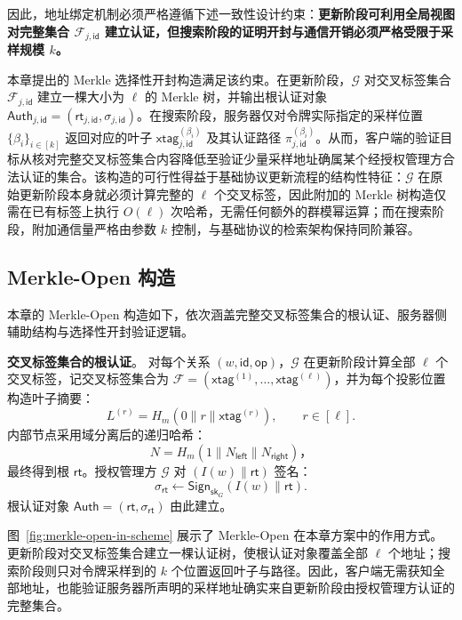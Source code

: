 因此，地址绑定机制必须严格遵循下述一致性设计约束：\textbf{更新阶段可利用全局视图对完整集合 $\mathcal{F}_{j,\mathsf{id}}$ 建立认证，但搜索阶段的证明开封与通信开销必须严格受限于采样规模 $k$。}

本章提出的 Merkle 选择性开封构造满足该约束。在更新阶段，$\mathcal{G}$ 对交叉标签集合 $\mathcal{F}_{j,\mathsf{id}}$ 建立一棵大小为 $\ell$ 的 Merkle 树，并输出根认证对象 $\mathsf{Auth}_{j,\mathsf{id}}=(\mathsf{rt}_{j,\mathsf{id}},\sigma_{j,\mathsf{id}})$。在搜索阶段，服务器仅对令牌实际指定的采样位置 $\{\beta_i\}_{i\in[k]}$ 返回对应的叶子 $\mathsf{xtag}_{j,\mathsf{id}}^{(\beta_i)}$ 及其认证路径 $\pi_{j,\mathsf{id}}^{(\beta_i)}$。从而，客户端的验证目标从核对完整交叉标签集合内容降低至验证少量采样地址确属某个经授权管理方合法认证的集合。该构造的可行性得益于基础协议更新流程的结构性特征：$\mathcal{G}$ 在原始更新阶段本身就必须计算完整的 $\ell$ 个交叉标签，因此附加的 Merkle 树构造仅需在已有标签上执行 $O(\ell)$ 次哈希，无需任何额外的群模幂运算；而在搜索阶段，附加通信量严格由参数 $k$ 控制，与基础协议的检索架构保持同阶兼容。

\subsection{Merkle-Open 构造}\label{sec:commit-construction}

本章的 Merkle-Open 构造如下，依次涵盖完整交叉标签集合的根认证、服务器侧辅助结构与选择性开封验证逻辑。

\textbf{交叉标签集合的根认证}。
对每个关系 $(w,\mathsf{id},\mathsf{op})$，$\mathcal{G}$ 在更新阶段计算全部 $\ell$ 个交叉标签，记交叉标签集合为 $\mathcal{F}=(\mathsf{xtag}^{(1)},\ldots,\mathsf{xtag}^{(\ell)})$，并为每个投影位置构造叶子摘要：
\begin{equation}\label{eq:commit-leaf}
L^{(r)}=H_m(0\|r\|\mathsf{xtag}^{(r)}),\qquad r\in[\ell].
\end{equation}
内部节点采用域分离后的递归哈希：
\begin{equation}\label{eq:commit-node}
N=H_m(1\|N_{\mathsf{left}}\|N_{\mathsf{right}})\text{，}
\end{equation}
最终得到根 $\mathsf{rt}$。授权管理方 $\mathcal{G}$ 对 $(I(w)\|\mathsf{rt})$ 签名：
\begin{equation}\label{eq:commit-auth}
\sigma_{\mathsf{rt}}\leftarrow \mathsf{Sign}_{\mathsf{sk}_G}(I(w)\|\mathsf{rt}).
\end{equation}
根认证对象 $\mathsf{Auth}=(\mathsf{rt},\sigma_{\mathsf{rt}})$ 由此建立。

图~\ref{fig:merkle-open-in-scheme} 展示了 Merkle-Open 在本章方案中的作用方式。更新阶段对交叉标签集合建立一棵认证树，使根认证对象覆盖全部 $\ell$ 个地址；搜索阶段则只对令牌采样到的 $k$ 个位置返回叶子与路径。因此，客户端无需获知全部地址，也能验证服务器所声明的采样地址确实来自更新阶段由授权管理方认证的完整集合。


